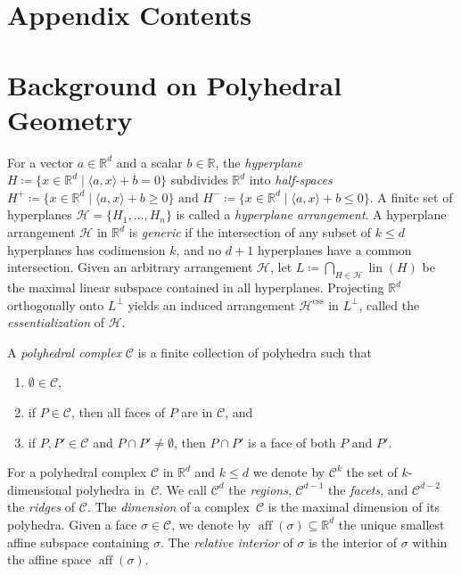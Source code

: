 \documentclass{article}
\makeatletter
\newcommand{\listofappendices}{%
  \section*{Appendix Contents}%
  \@starttoc{apx}%
}
\theoremstyle{definition}
\newcommand{\aff}{\operatorname{aff}}
\newcommand{\R}{\mathbb{R}}
\newcommand{\complex}{\mathcal{C}}
\newcommand{\inner}[1]{\langle #1 \rangle}
\newcommand{\lin}{\operatorname{lin}}
\makeatother
\begin{document}


\newpage



\appendix

\listofappendices


\section{Background on Polyhedral Geometry}
\label{app:polyheadral_geometry}


For a vector $a \in \R^{d}$ and a scalar $b \in \R$, the \emph{hyperplane} $H \coloneqq \{x \in \R^d \mid \inner{a,x}+b=0\}$ subdivides $\R^d$ into \emph{half-spaces} $H^{+}\coloneqq \{x \in \R^d \mid \inner{a,x}+b\geq 0\} \text{ and }{H}^{-} \coloneqq \{x \in \R^d \mid \inner{a,x}+b\leq0\}.$
A finite set of hyperplanes $\mathcal H = \{H_1,\dots,H_n\}$ is called a \emph{hyperplane arrangement}. 
A hyperplane arrangement $\mathcal H$ in $\R^d$ is \emph{generic} if the intersection of any subset of $k \leq d$ hyperplanes has codimension $k$, and no $d+1$ hyperplanes have a common intersection. 
Given an arbitrary arrangement $\mathcal H$, let
$
L \coloneqq \bigcap_{H \in \mathcal H} \lin(H)
$
be the maximal linear subspace contained in all hyperplanes.
Projecting $\R^d$ orthogonally onto $L^\perp$ yields an induced arrangement
$\mathcal H^{\mathrm{ess}}$ in $L^\perp$, called the \emph{essentialization} of
$\mathcal H$.

A \emph{polyhedral complex} $\complex$ is a finite collection of polyhedra such that 
\begin{enumerate}
    \item $\emptyset \in \complex$,
    \item if $P \in \complex$, then all faces of $P$ are in $\complex$, and 
    \item if $P, P' \in \complex$ and $P\cap P'\neq\emptyset$, then $P \cap P'$ is a face of both $P$ and $P'$. 
\end{enumerate} 
For a polyhedral complex $\complex$ in $\R^d$ and $k \leq d$ we denote by $\complex^k$ the set of $k$-dimensional polyhedra in~$\complex$. 
We call $\complex^d$ the \emph{regions}, $\complex^{d-1}$ the \emph{facets}, and $\complex^{d-2}$ the \emph{ridges} of $\complex$. 
The \emph{dimension} of a complex~$\complex$ is the maximal dimension of its polyhedra. 
Given a face $\sigma \in \complex$, we denote by $\aff(\sigma) \subseteq \R^d$ the unique smallest affine subspace containing $\sigma$. The \emph{relative interior} of $\sigma$ is the interior of $\sigma$ within the affine space $\aff(\sigma)$. 
\end{document}
